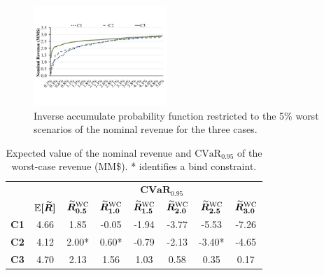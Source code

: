 \begin{figure}[!t]
	\centering
	\includegraphics[viewport= 14 98 701 443, clip, width=0.45\textwidth]{./Figures/CurvaPertinencia.pdf}
	\caption{Inverse accumulate probability function restricted to the 5\% worst scenarios of the nominal revenue for the three cases.}
	\label{IAF_CVaR}
\end{figure}
%
\begin{table}
	\renewcommand{\arraystretch}{1.2}
	\centering
	\caption{Expected value of the nominal revenue and $\text{CVaR}_{0.95}$ of the worst-case revenue (MM\$). * identifies a bind constraint.}
	\begin{tabular}{ r | c || c  c  c  c  c  c }
		& & \multicolumn{6}{c}{$\boldsymbol{\text{CVaR}_{0.95}}$} \\
		& $\boldsymbol{\mathbb{E}[\accentset{\sim}{R}]}$ & $\boldsymbol{\accentset{\sim}{R}_{0.5}^{\text{WC}}}$ & $\boldsymbol{\accentset{\sim}{R}_{1.0}^{\text{WC}}}$ & $\boldsymbol{\accentset{\sim}{R}_{1.5}^{\text{WC}}}$ & $\boldsymbol{\accentset{\sim}{R}_{2.0}^{\text{WC}}}$ & $\boldsymbol{\accentset{\sim}{R}_{2.5}^{\text{WC}}}$ & $\boldsymbol{\accentset{\sim}{R}_{3.0}^{\text{WC}}}$ \\
		\hline
		\textbf{C1} & 4.66 & 1.85 & -0.05 & -1.94 & -3.77 & -5.53 & -7.26 \\
		\textbf{C2} & 4.12 & 2.00* & 0.60* & -0.79 & -2.13 & -3.40* & -4.65 \\
		\textbf{C3} & 4.70 & 2.13 & 1.56 & 1.03 & 0.58 & 0.35 & 0.17
	\end{tabular}
	\label{InSample_Analysis}
\end{table}

